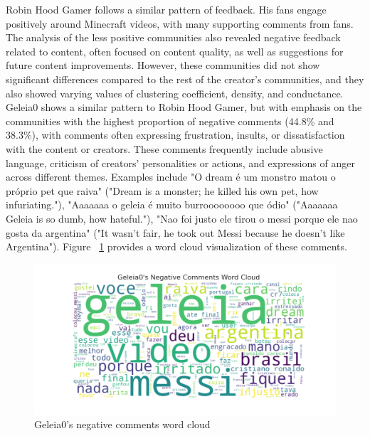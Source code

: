\documentclass[sigconf]{acmart}
\begin{document}
Robin Hood Gamer follows a similar pattern of feedback. His fans engage positively around Minecraft videos, 
with many supporting comments from fans. 
The analysis of the less positive communities also revealed 
negative feedback related to content, often focused on content quality, as well as suggestions for future 
content improvements. However, these communities did not show significant differences compared to the rest of 
the creator's communities, and they also showed varying values of clustering coefficient, density, and conductance.
Geleia0 shows a similar pattern to Robin Hood Gamer, but with emphasis on the communities with the highest proportion of
negative comments (44.8\% and 38.3\%), with comments often expressing frustration, insults, or dissatisfaction with the content 
or creators. These comments frequently include abusive language, criticism of creators' personalities 
or actions, and expressions of anger across different themes. Examples include 
"O dream é um monstro matou o próprio pet que raiva" ("Dream is a monster; he killed his own pet, how infuriating."), 
"Aaaaaaa o geleia é muito burroooooooo que ódio" ("Aaaaaaa Geleia is so dumb, how hateful."), 
"Nao foi justo ele tirou o messi porque ele nao gosta da argentina" ("It wasn't fair, he took out Messi because he doesn't like Argentina").
Figure ~\ref{fig:geleia_comments} provides a word cloud visualization of these comments.  

\begin{figure}[hbt!]
    \centering
    \includegraphics[keepaspectratio,width=\linewidth]{./imgs/geleia/negative_comments.png}
    \caption[width=\textwidth]{Geleia0's negative comments word cloud}
    \label{fig:geleia_comments}
\end{figure}
\end{document}
